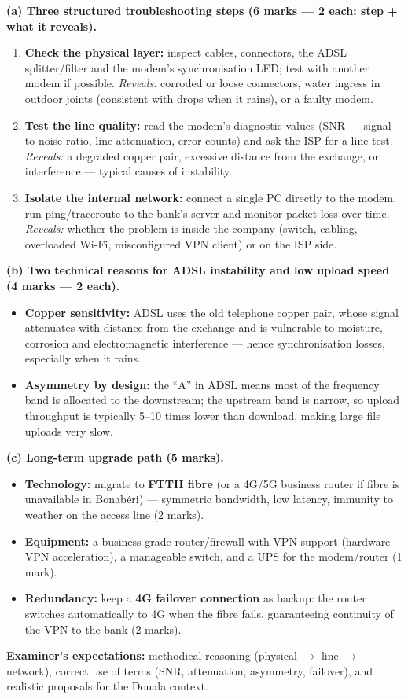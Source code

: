 \documentclass[11pt]{article}
\begin{document}
\begin{corrige}
\textbf{(a) Three structured troubleshooting steps (6 marks — 2 each: step + what it reveals).}
\begin{enumerate}
\item \textbf{Check the physical layer:} inspect cables, connectors, the ADSL splitter/filter and the modem's synchronisation LED; test with another modem if possible. \emph{Reveals:} corroded or loose connectors, water ingress in outdoor joints (consistent with drops when it rains), or a faulty modem.
\item \textbf{Test the line quality:} read the modem's diagnostic values (SNR — signal-to-noise ratio, line attenuation, error counts) and ask the ISP for a line test. \emph{Reveals:} a degraded copper pair, excessive distance from the exchange, or interference — typical causes of instability.
\item \textbf{Isolate the internal network:} connect a single PC directly to the modem, run ping/traceroute to the bank's server and monitor packet loss over time. \emph{Reveals:} whether the problem is inside the company (switch, cabling, overloaded Wi-Fi, misconfigured VPN client) or on the ISP side.
\end{enumerate}

\textbf{(b) Two technical reasons for ADSL instability and low upload speed (4 marks — 2 each).}
\begin{itemize}
\item \textbf{Copper sensitivity:} ADSL uses the old telephone copper pair, whose signal attenuates with distance from the exchange and is vulnerable to moisture, corrosion and electromagnetic interference — hence synchronisation losses, especially when it rains.
\item \textbf{Asymmetry by design:} the ``A'' in ADSL means most of the frequency band is allocated to the downstream; the upstream band is narrow, so upload throughput is typically 5--10 times lower than download, making large file uploads very slow.
\end{itemize}

\textbf{(c) Long-term upgrade path (5 marks).}
\begin{itemize}
\item \textbf{Technology:} migrate to \textbf{FTTH fibre} (or a 4G/5G business router if fibre is unavailable in Bonab\'eri) — symmetric bandwidth, low latency, immunity to weather on the access line (2 marks).
\item \textbf{Equipment:} a business-grade router/firewall with VPN support (hardware VPN acceleration), a manageable switch, and a UPS for the modem/router (1 mark).
\item \textbf{Redundancy:} keep a \textbf{4G failover connection} as backup: the router switches automatically to 4G when the fibre fails, guaranteeing continuity of the VPN to the bank (2 marks).
\end{itemize}
\textbf{Examiner's expectations:} methodical reasoning (physical $\rightarrow$ line $\rightarrow$ network), correct use of terms (SNR, attenuation, asymmetry, failover), and realistic proposals for the Douala context.
\end{corrige}
\end{document}
